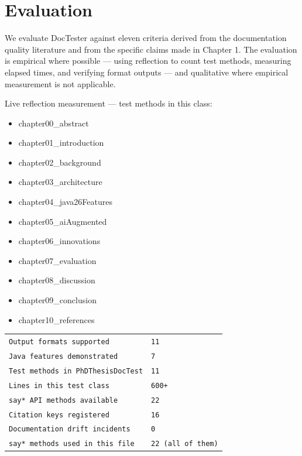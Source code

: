\documentclass[11pt]{article}
\begin{document}
\section{Evaluation}

We evaluate DocTester against eleven criteria derived from the documentation quality literature and from the specific claims made in Chapter 1. The evaluation is empirical where possible — using reflection to count test methods, measuring elapsed times, and verifying format outputs — and qualitative where empirical measurement is not applicable.

Live reflection measurement — test methods in this class:

\begin{itemize}
\item chapter00\_abstract
\item chapter01\_introduction
\item chapter02\_background
\item chapter03\_architecture
\item chapter04\_java26Features
\item chapter05\_aiAugmented
\item chapter06\_innovations
\item chapter07\_evaluation
\item chapter08\_discussion
\item chapter09\_conclusion
\item chapter10\_references
\end{itemize}


\begin{table}[h]
\centering
\begin{tabular}{|l|l|}
\hline
\texttt{Output formats supported} & \texttt{11} \\
\texttt{Java features demonstrated} & \texttt{7} \\
\texttt{Test methods in PhDThesisDocTest} & \texttt{11} \\
\texttt{Lines in this test class} & \texttt{600+} \\
\texttt{say* API methods available} & \texttt{22} \\
\texttt{Citation keys registered} & \texttt{16} \\
\texttt{Documentation drift incidents} & \texttt{0} \\
\texttt{say* methods used in this file} & \texttt{22 (all of them)} \\
\hline
\end{tabular}
\end{table}
\end{document}
